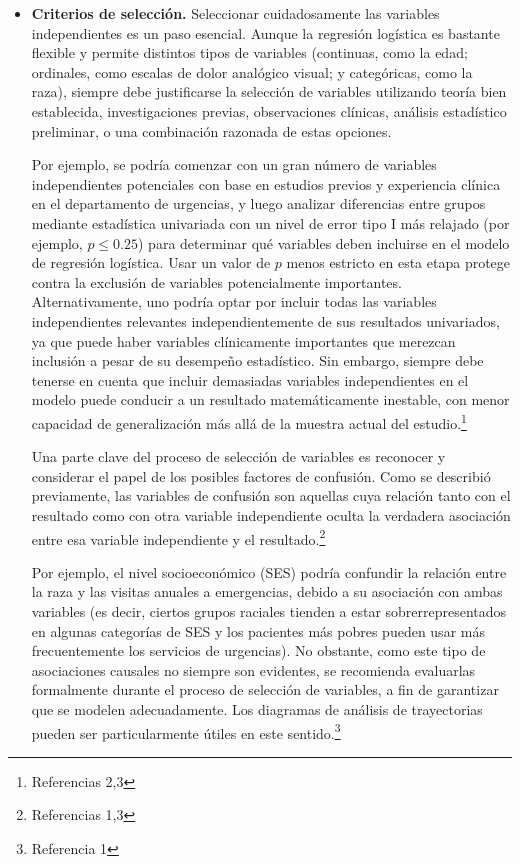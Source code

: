 \documentclass[12pt]{article}
\begin{document}
\begin{itemize}
\item[1.] \textbf{Criterios de selecci\'on.} Seleccionar cuidadosamente las variables independientes es un paso esencial. Aunque la regresi\'on log\'istica es bastante flexible y permite distintos tipos de variables (continuas, como la edad; ordinales, como escalas de dolor anal\'ogico visual; y categ\'oricas, como la raza), siempre debe justificarse la selecci\'on de variables utilizando teor\'ia bien establecida, investigaciones previas, observaciones cl\'inicas, an\'alisis estad\'istico preliminar, o una combinaci\'on razonada de estas opciones.

Por ejemplo, se podr\'ia comenzar con un gran n\'umero de variables independientes potenciales con base en estudios previos y experiencia cl\'inica en el departamento de urgencias, y luego analizar diferencias entre grupos mediante estad\'istica univariada con un nivel de error tipo I m\'as relajado (por ejemplo, $p \leq 0.25$) para determinar qu\'e variables deben incluirse en el modelo de regresi\'on log\'istica. Usar un valor de $p$ menos estricto en esta etapa protege contra la exclusi\'on de variables potencialmente importantes. Alternativamente, uno podr\'ia optar por incluir todas las variables independientes relevantes independientemente de sus resultados univariados, ya que puede haber variables cl\'inicamente importantes que merezcan inclusi\'on a pesar de su desempe\~no estad\'istico. Sin embargo, siempre debe tenerse en cuenta que incluir demasiadas variables independientes en el modelo puede conducir a un resultado matem\'aticamente inestable, con menor capacidad de generalizaci\'on m\'as all\'a de la muestra actual del estudio.\footnote{Referencias 2,3}

Una parte clave del proceso de selecci\'on de variables es reconocer y considerar el papel de los posibles factores de confusi\'on. Como se describi\'o previamente, las variables de confusi\'on son aquellas cuya relaci\'on tanto con el resultado como con otra variable independiente oculta la verdadera asociaci\'on entre esa variable independiente y el resultado.\footnote{Referencias 1,3}

Por ejemplo, el nivel socioecon\'omico (SES) podr\'ia confundir la relaci\'on entre la raza y las visitas anuales a emergencias, debido a su asociaci\'on con ambas variables (es decir, ciertos grupos raciales tienden a estar sobrerrepresentados en algunas categor\'ias de SES y los pacientes m\'as pobres pueden usar m\'as frecuentemente los servicios de urgencias). No obstante, como este tipo de asociaciones causales no siempre son evidentes, se recomienda evaluarlas formalmente durante el proceso de selecci\'on de variables, a fin de garantizar que se modelen adecuadamente. Los diagramas de an\'alisis de trayectorias pueden ser particularmente \'utiles en este sentido.\footnote{Referencia 1}


\end{itemize}
\end{document}
